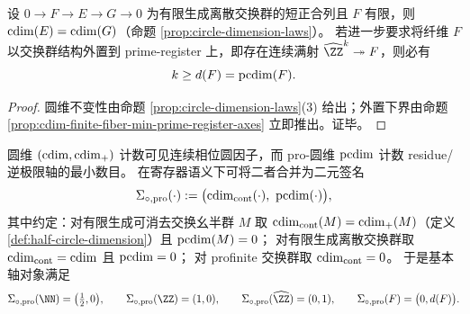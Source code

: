 \begin{corollary}[有限扩张的圆维不变与结构性外置下界]\label{cor:cdim-finite-extension-pro-cdim-lower-bound}
设 \(0\to F\to E\to G\to 0\) 为有限生成离散交换群的短正合列且 \(F\) 有限，则 \(\operatorname{cdim}(E)=\operatorname{cdim}(G)\)（命题 \ref{prop:circle-dimension-laws}）。
若进一步要求将纤维 \(F\) 以交换群结构外置到 prime-register 上，即存在连续满射 \(\widehat{\ZZ}^{k}\twoheadrightarrow F\)，则必有
\[
k\ge d(F)=\operatorname{pcdim}(F).
\]
\end{corollary}
\begin{proof}
圆维不变性由命题 \ref{prop:circle-dimension-laws}(3) 给出；外置下界由命题 \ref{prop:cdim-finite-fiber-min-prime-register-axes} 立即推出。证毕。
\end{proof}

\begin{remark}\label{rem:cdim-cont-pro-signature}
圆维 \((\operatorname{cdim},\operatorname{cdim}_+)\) 计数可见连续相位圆因子，而 pro-圆维 \(\operatorname{pcdim}\) 计数 residue/逆极限轴的最小数目。
在寄存器语义下可将二者合并为二元签名
\[
\Sigma_{\circ,\mathrm{pro}}(\cdot):=\bigl(\cdim_{\mathrm{cont}}(\cdot),\ \pcdim(\cdot)\bigr),
\]
其中约定：对有限生成可消去交换幺半群 \(M\) 取 \(\operatorname{cdim}_{\mathrm{cont}}(M)=\operatorname{cdim}_+(M)\)（定义 \ref{def:half-circle-dimension}）且 \(\operatorname{pcdim}(M)=0\)；
对有限生成离散交换群取 \(\operatorname{cdim}_{\mathrm{cont}}=\operatorname{cdim}\) 且 \(\operatorname{pcdim}=0\)；
对 profinite 交换群取 \(\operatorname{cdim}_{\mathrm{cont}}=0\)。
于是基本轴对象满足
\[
\Sigma_{\circ,\mathrm{pro}}(\NN)=\bigl(\tfrac12,0\bigr),\qquad
\Sigma_{\circ,\mathrm{pro}}(\ZZ)=(1,0),\qquad
\Sigma_{\circ,\mathrm{pro}}(\widehat{\ZZ})=(0,1),
\qquad
\Sigma_{\circ,\mathrm{pro}}(F)=\bigl(0,d(F)\bigr).
\]
\end{remark}

\endinput
